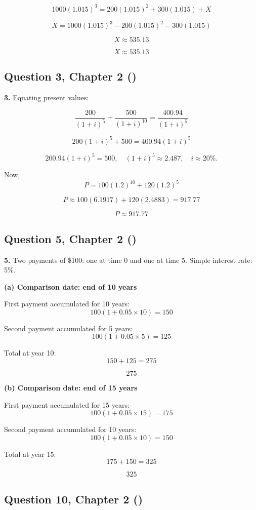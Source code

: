 \documentclass[12pt, a4paper]{article}
\begin{document}
\[
1000(1.015)^3 = 200(1.015)^2 + 300(1.015) + X
\]

\[
X = 1000(1.015)^3 - 200(1.015)^2 - 300(1.015)
\]

\[
X \approx 535.13
\]

\[
\boxed{X \approx 535.13}
\]


\subsection*{Question 3, Chapter 2 (\cite{toi3rd})}

\textbf{3.} Equating present values:

\[
\frac{200}{(1+i)^5} + \frac{500}{(1+i)^{10}} 
= \frac{400.94}{(1+i)^5}
\]

\[
200(1+i)^5 + 500 = 400.94(1+i)^5
\]

\[
200.94(1+i)^5 = 500, 
\quad (1+i)^5 \approx 2.487, 
\quad i \approx 20\%.
\]

Now,
\[
P = 100(1.2)^{10} + 120(1.2)^5
\]

\[
P \approx 100(6.1917) + 120(2.4883) = 917.77
\]

\[
\boxed{P \approx 917.77}
\]


\subsection*{Question 5, Chapter 2 (\cite{toi3rd})}

\textbf{5.} Two payments of \$100: one at time 0 and one at time 5.  
Simple interest rate: 5\%.

\bigskip
\textbf{(a) Comparison date: end of 10 years}

First payment accumulated for 10 years:
\[
100(1+0.05 \times 10) = 150
\]

Second payment accumulated for 5 years:
\[
100(1+0.05 \times 5) = 125
\]

Total at year 10:
\[
150 + 125 = 275
\]

\[
\boxed{275}
\]

\bigskip
\textbf{(b) Comparison date: end of 15 years}

First payment accumulated for 15 years:
\[
100(1+0.05 \times 15) = 175
\]

Second payment accumulated for 10 years:
\[
100(1+0.05 \times 10) = 150
\]

Total at year 15:
\[
175 + 150 = 325
\]

\[
\boxed{325}
\]


\subsection*{Question 10, Chapter 2 (\cite{toi3rd})}
\end{document}
